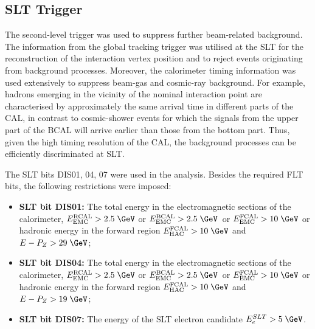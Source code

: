 \subsection{SLT Trigger}
\label{subsec:sltcuts}
The second-level trigger was used to suppress further beam-related background. The information from the \zeus global tracking trigger was utilised at the SLT for the reconstruction of the interaction vertex position and to reject events originating from background processes. Moreover, the calorimeter timing information was used extensively to suppress beam-gas and cosmic-ray background. For example, hadrons emerging in the vicinity of the nominal interaction point are characterised by approximately the same arrival time in different parts of the CAL, in contrast to cosmic-shower events for which the signals from the upper part of the BCAL will arrive earlier than those from the bottom part. Thus, given the high timing resolution of the CAL, the background processes can be efficiently discriminated at SLT.

The SLT bits DIS01, 04, 07 were used in the analysis. Besides the required FLT bits, the following restrictions were imposed:
\begin{itemize}
	\item \textbf{SLT bit DIS01:} The total energy in the electromagnetic sections of the calorimeter, $E_\text{EMC}^\text{RCAL} > 2.5\;\GeV$ or $E_\text{EMC}^\text{BCAL} > 2.5\;\GeV$~or $E_\text{EMC}^\text{FCAL} > 10\;\GeV$ or hadronic energy in the forward region $E_\text{HAC}^\text{FCAL} > 10\;\GeV$ and $E-P_Z > 29\;\GeV$;
	\item \textbf{SLT bit DIS04:} The total energy in the electromagnetic sections of the calorimeter, $E_\text{EMC}^\text{RCAL} > 2.5\;\GeV$ or $E_\text{EMC}^\text{BCAL} > 2.5\;\GeV$~or $E_\text{EMC}^\text{FCAL} > 10\;\GeV$ or hadronic energy in the forward region $E_\text{HAC}^\text{FCAL} > 10\;\GeV$ and $E-P_Z > 19\;\GeV$;
	\item \textbf{SLT bit DIS07:} The energy of the SLT electron candidate $E_e^{SLT}>5\;\GeV$.
\end{itemize}

